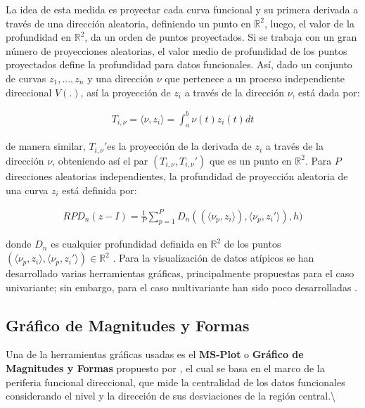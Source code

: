 \documentclass[
]{book}
\begin{document}
La idea de esta medida es proyectar cada curva funcional y su primera derivada a través de una dirección aleatoria, definiendo un punto en \(\mathbb{R}^2\), luego, el valor de la profundidad en \(\mathbb{R}^2\), da un orden de puntos proyectados. Si se trabaja con un gran número de proyecciones aleatorias, el valor medio de profundidad de los puntos proyectados define la profundidad para datos funcionales. Así, dado un conjunto de curvas \(z_1,...,z_n\) y una dirección \(\nu\) que pertenece a un proceso independiente direccional \(V(.)\), así la proyección de \(z_i\) a través de la dirección \(\nu\), está dada por:

\begin{align}
    T_{i,\nu}=\langle \nu,z_i \rangle=\int_a^b \nu(t)z_i(t)dt
\end{align}

de manera similar, \(T_{i,\nu}'\)es la proyección de la derivada de \(z_i\) a través de la dirección \(\nu\), obteniendo así el par \((T_{i,\nu},T_{i,\nu}')\) que es un punto en \(\mathbb{R}^2\). Para \(P\) direcciones aleatorias independientes, la profundidad de proyección aleatoria de una curva \(z_i\) está definida por:

\begin{align}
    RPD_n(z-I)=\frac{1}{P}\sum_{p=1}^P D_n((\langle\nu_{p},z_i \rangle),\langle\nu_p, z_{i}'\rangle), h)
\end{align}

donde \(D_n\) es cualquier profundidad definida en \(\mathbb{R}^2\) de los puntos \((\langle\nu_p,z_i \rangle,\langle\nu_p,z_i' \rangle) \in \mathbb{R}^2\) \citep{manuel}. Para la visualización de datos atípicos se han desarrollado varias herramientas gráficas, principalmente propuestas para el caso univariante; sin embargo, para el caso multivariante han sido poco desarrolladas \citep{dai}.

\hypertarget{gruxe1fico-de-magnitudes-y-formas}{%
\subsection{Gráfico de Magnitudes y Formas}\label{gruxe1fico-de-magnitudes-y-formas}}

Una de la herramientas gráficas usadas es el \textbf{MS-Plot} o \textbf{Gráfico de Magnitudes y Formas} propuesto por \citep{dai}, el cual se basa en el marco de la periferia funcional direccional, que mide la centralidad de los datos funcionales considerando el nivel y la dirección de sus desviaciones de la región central.\textbackslash{}
\end{document}
